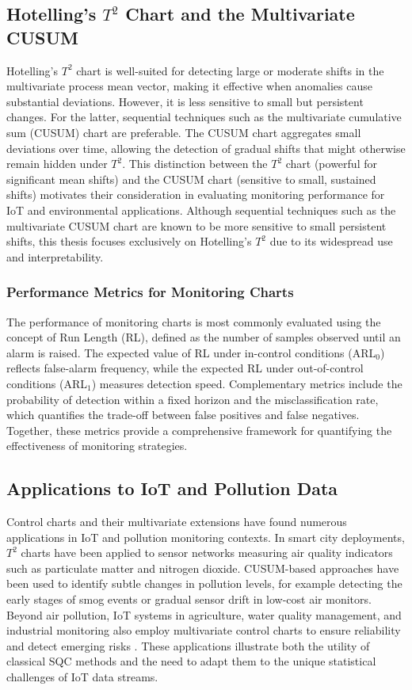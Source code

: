 \subsection{Hotelling's $T^2$ Chart and the Multivariate CUSUM}
Hotelling's $T^2$ chart is well-suited for detecting large or moderate shifts in the multivariate process mean vector, making it effective when anomalies cause substantial deviations. However, it is less sensitive to small but persistent changes. For the latter, sequential techniques such as the multivariate cumulative sum (CUSUM) chart are preferable. The CUSUM chart aggregates small deviations over time, allowing the detection of gradual shifts that might otherwise remain hidden under $T^2$. This distinction between the $T^2$ chart (powerful for significant mean shifts) and the CUSUM chart (sensitive to small, sustained shifts) motivates their consideration in evaluating monitoring performance for \ac{IoT} and environmental applications.
Although sequential techniques such as the multivariate CUSUM chart are known to be more sensitive to small persistent shifts, this thesis focuses exclusively on Hotelling’s $T^2$ due to its widespread use and interpretability.

\subsubsection{Performance Metrics for Monitoring Charts}
The performance of monitoring charts is most commonly evaluated using the concept of Run Length (RL), defined as the number of samples observed until an alarm is raised. The expected value of RL under in-control conditions (ARL$_0$) reflects false-alarm frequency, while the expected RL under out-of-control conditions (ARL$_1$) measures detection speed. Complementary metrics include the probability of detection within a fixed horizon and the misclassification rate, which quantifies the trade-off between false positives and false negatives. Together, these metrics provide a comprehensive framework for quantifying the effectiveness of monitoring strategies.

\subsection{Applications to IoT and Pollution Data}
Control charts and their multivariate extensions have found numerous applications in \ac{IoT} and pollution monitoring contexts. In smart city deployments, $T^2$ charts have been applied to sensor networks measuring air quality indicators such as particulate matter and nitrogen dioxide. CUSUM-based approaches have been used to identify subtle changes in pollution levels, for example detecting the early stages of smog events or gradual sensor drift in low-cost air monitors\cite{Xie2023}. Beyond air pollution, \ac{IoT} systems in agriculture, water quality management, and industrial monitoring also employ multivariate control charts to ensure reliability and detect emerging risks \cite{Belay2023} \cite{Kourti2005}. These applications illustrate both the utility of classical \ac{SQC} methods and the need to adapt them to the unique statistical challenges of \ac{IoT} data streams.

